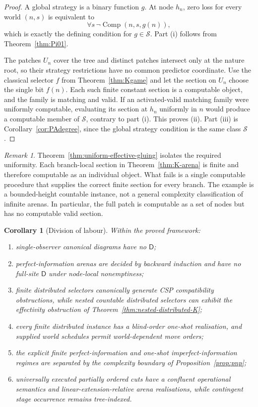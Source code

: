 \documentclass[11pt]{article}
\theoremstyle{plain}
\newtheorem{corollary}[theorem]{Corollary}
\theoremstyle{definition}
\theoremstyle{remark}
\newtheorem{remark}[theorem]{Remark}
\begin{document}
\begin{proof}
A global strategy is a binary function $g$. At node $h_n$, zero loss for every
world $(n,s)$ is equivalent to
\[
\forall s\,\neg\operatorname{Comp}(n,s,g(n)),
\]
which is exactly the defining condition for $g\in\mathcal S$. Part (i) follows
from Theorem~\ref{thm:Pi01}.

The patches $U_n$ cover the tree and distinct patches intersect only at the
nature root, so their strategy restrictions have no common predictor coordinate.
Use the classical selector $f$ from Theorem~\ref{thm:Kgame} and let the section
on $U_n$ choose the single bit $f(n)$. Each such finite constant section is a
computable object, and the family is matching and valid. If an activated-valid
matching family were uniformly computable, evaluating its section at $h_n$
uniformly in $n$ would produce a computable member of $\mathcal S$, contrary to
part (i). This proves (ii). Part (iii) is Corollary~\ref{cor:PAdegree}, since the
global strategy condition is the same class $\mathcal S$.
\end{proof}

\begin{remark}
Theorem~\ref{thm:uniform-effective-gluing} isolates the required uniformity.
Each branch-local section in Theorem~\ref{thm:K-arena} is finite and therefore
computable as an individual object. What fails is a single computable procedure
that supplies the correct finite section for every branch. The example is a
bounded-height countable instance, not a general complexity classification of
infinite arenas. In particular, the full patch is computable as a set of nodes
but has no computable valid section.
\end{remark}

\begin{corollary}[Division of labour]\label{cor:division}
Within the proved framework:
\begin{enumerate}[label=(\roman*)]
\item single-observer canonical diagrams have no $\mathsf D$;
\item perfect-information arenas are decided by backward induction and have no
full-site $\mathsf D$ under node-local nonemptiness;
\item finite distributed selectors canonically generate CSP compatibility
obstructions, while nested countable distributed selectors can exhibit the
effectivity obstruction of Theorem~\ref{thm:nested-distributed-K};
\item every finite distributed instance has a blind-order one-shot realisation,
and supplied world schedules permit world-dependent move orders;
\item the explicit finite perfect-information and one-shot imperfect-information
regimes are separated by the complexity boundary of Proposition~\ref{prop:pnp};
\item universally executed partially ordered cuts have a confluent operational
semantics and linear-extension-relative arena realisations, while contingent
stage occurrence remains tree-indexed.
\end{enumerate}
\end{corollary}
\end{document}
